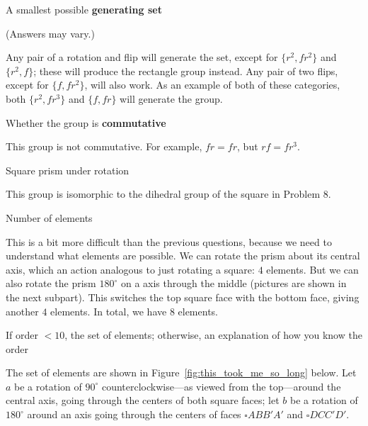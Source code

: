 \documentclass[../gatm_answers.tex]{subfiles}
\begin{document}
\begin{inner_problem}
\item A smallest possible \textbf{generating set}
\end{inner_problem}

\noindent(Answers may vary.)

Any pair of a rotation and flip will generate the set, except for $\{r^2,fr^2\}$ and $\{r^2,f\}$; these will produce the rectangle group instead. Any pair of two flips, except for $\{f,fr^2\}$, will also work. As an example of both of these categories, both $\{r^2,fr^3\}$ and $\{f,fr\}$ will generate the group.

\begin{inner_problem}
\item Whether the group is \textbf{commutative}
\end{inner_problem}

\noindent This group is not commutative. For example, $fr=fr$, but $rf=fr^3$.

\begin{outer_problem}
\item Square prism under rotation
\end{outer_problem}

\noindent This group is isomorphic to the dihedral group of the square in Problem 8.

\begin{inner_problem}[start=1]
\item Number of elements
\end{inner_problem}

\noindent This is a bit more difficult than the previous questions, because we need to understand what elements are possible. We can rotate the prism about its central axis, which an action analogous to just rotating a square: $4$ elements. But we can also rotate the prism $180^\circ$ on a axis through the middle (pictures are shown in the next subpart). This switches the top square face with the bottom face, giving another $4$ elements. In total, we have $8$ elements.

\begin{inner_problem}
\item If order $< 10$, the set of elements; otherwise, an explanation of how you know the order
\end{inner_problem}

\noindent The set of elements are shown in Figure~\ref{fig:this_took_me_so_long} below. Let $a$ be a rotation of $90^\circ$ counterclockwise---as viewed from the top---around the central axis, going through the centers of both square faces; let $b$ be a rotation of $180^\circ$ around an axis going through the centers of faces $\square ABB'A'$ and $\square DCC'D'$.
\end{document}
